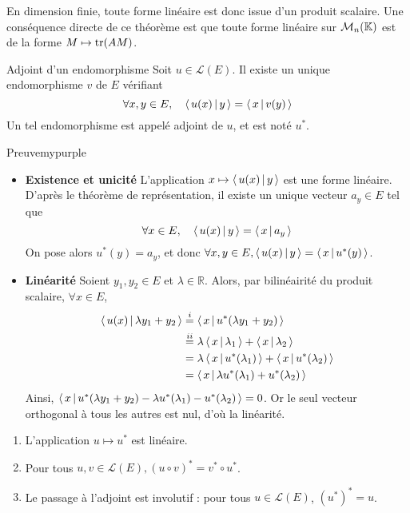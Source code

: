     En dimension finie, toute forme linéaire est donc issue d’un produit scalaire. Une conséquence directe de ce théorème est que toute forme linéaire sur $\mathcal{M}_{n}(\mathbb{K})$ est de la forme $M \mapsto \operatorname{tr}(AM)$.

    \begin{defitheo}{Adjoint d’un endomorphisme}{}
        Soit $u \in \mathcal{L}(E)$. Il existe un unique endomorphisme $v$ de $E$ vérifiant 
        \[ \forall x, y \in E, \quad \left<\,u(x)\,\middle|\,y\,\right> = \left<\,x\,\middle|\,v(y)\,\right> \]   
        Un tel endomorphisme est appelé adjoint de $u$, et est noté $u^*$.
    \end{defitheo}

    \begin{demo}{Preuve}{mypurple}
        \begin{itemize}
            \item \textbf{Existence et unicité} \quad L’application $x \mapsto \left<\,u(x)\,\middle|\,y\,\right>$ est une forme linéaire. D’après le théorème de représentation, il existe un unique vecteur $a_y \in E$ tel que 
            \[ \forall x \in E, \quad \left<\,u(x)\,\middle|\,y\,\right> = \left<\,x\,\middle|\,a_y\,\right> \]   
            On pose alors $u^*(y) = a_y$, et donc $\forall x,y \in E, \left<\,u(x)\,\middle|\,y\,\right> = \left<\,x\,\middle|\,u^*(y)\,\right>$.
            \item \textbf{Linéarité} \quad Soient $y_1,y_2 \in E$ et $\lambda \in \mathbb{R}$. Alors, par bilinéairité du produit scalaire, $\forall x \in E$, 
            \begin{align*}
                \left<\,u(x)\,\middle|\,\lambda y_1 + y_2\,\right> 
                &\overset{i}{=} \left<\,x\,\middle|\,u^*(\lambda y_1 + y_2)\,\right> \\
                &\overset{ii}{=} \lambda \left<\,x\,\middle|\,\lambda_1\,\right> + \left<\,x\,\middle|\,\lambda_2\,\right> \\
                &= \lambda \left<\,x\,\middle|\,u^*(\lambda_1)\,\right> + \left<\,x\,\middle|\,u^*(\lambda_2)\,\right> \\
                &= \left<\,x\,\middle|\,\lambda u^*(\lambda_1) + u^*(\lambda_2)\,\right> 
            \end{align*}
            Ainsi, $\left<\,x\,\middle|\,u^*(\lambda y_1 + y_2) - \lambda u^*(\lambda_1) - u^*(\lambda_2)\,\right> = 0$. Or le seul vecteur orthogonal à tous les autres est nul, d’où la linéarité.
        \end{itemize}
    \end{demo}

    \begin{prop}{}{}
        \begin{enumerate}
            \item L’application $u \mapsto u^*$ est linéaire.
            \item Pour tous $u,v \in \mathcal{L}(E), (u \circ v)^* = v^* \circ u^*$.
            \item Le passage à l’adjoint est involutif : pour tous $u \in \mathcal{L}(E)$, $(u^*)^* = u$.
        \end{enumerate}
    \end{prop}

